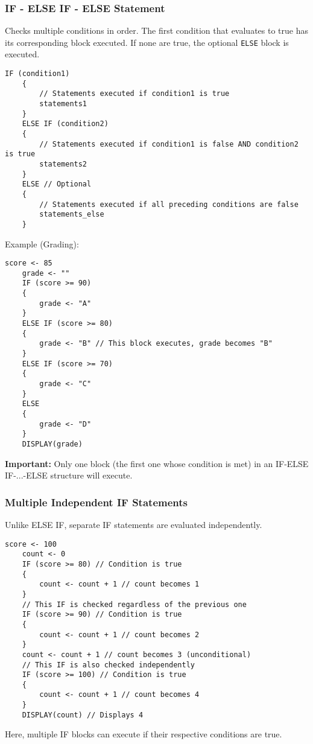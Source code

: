 \documentclass[11pt,oneside]{book}
\begin{document}
\subsubsection*{IF - ELSE IF - ELSE Statement}
Checks multiple conditions in order. The first condition that evaluates to true has its corresponding block executed. If none are true, the optional \texttt{ELSE} block is executed.
\begin{lstlisting}[language={}, label={lst:if_elseif_else}, caption={AP Pseudocode: IF - ELSE IF - ELSE}]
    IF (condition1)
    {
        // Statements executed if condition1 is true
        statements1
    }
    ELSE IF (condition2)
    {
        // Statements executed if condition1 is false AND condition2 is true
        statements2
    }
    ELSE // Optional
    {
        // Statements executed if all preceding conditions are false
        statements_else
    }
\end{lstlisting}
Example (Grading):
\begin{lstlisting}[language={}, label={lst:grading_example}]
    score <- 85
    grade <- ""
    IF (score >= 90)
    {
        grade <- "A"
    }
    ELSE IF (score >= 80)
    {
        grade <- "B" // This block executes, grade becomes "B"
    }
    ELSE IF (score >= 70)
    {
        grade <- "C"
    }
    ELSE
    {
        grade <- "D"
    }
    DISPLAY(grade)
\end{lstlisting}
\textbf{Important:} Only one block (the first one whose condition is met) in an IF-ELSE IF-...-ELSE structure will execute.

\subsubsection*{Multiple Independent IF Statements}
Unlike ELSE IF, separate IF statements are evaluated independently.
\begin{lstlisting}[language={}, label={lst:multiple_if}, caption={AP Pseudocode: Multiple Independent IFs}]
    score <- 100
    count <- 0
    IF (score >= 80) // Condition is true
    {
        count <- count + 1 // count becomes 1
    }
    // This IF is checked regardless of the previous one
    IF (score >= 90) // Condition is true
    {
        count <- count + 1 // count becomes 2
    }
    count <- count + 1 // count becomes 3 (unconditional)
    // This IF is also checked independently
    IF (score >= 100) // Condition is true
    {
        count <- count + 1 // count becomes 4
    }
    DISPLAY(count) // Displays 4
\end{lstlisting}
Here, multiple IF blocks can execute if their respective conditions are true.
\end{document}
